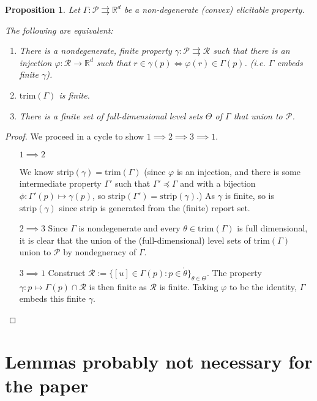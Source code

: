 \documentclass[12pt]{article}
\newcommand{\reals}{\mathbb{R}}
\renewcommand{\P}{\mathcal{P}}
\newcommand{\R}{\mathcal{R}}
\newcommand{\inter}[1]{\mathring{#1}}%
\newcommand{\toto}{\rightrightarrows}
\newcommand{\trim}{\mathrm{trim}}
\newcommand{\strip}{\mathrm{strip}}
\newtheorem{proposition}{Proposition}
\begin{document}
\begin{proposition}\label{prop:optimal-reports-per-level-set}
  Let $\Gamma:\P\toto\reals^d$ be a non-degenerate (convex) elicitable property.

  The following are equivalent:
  \begin{enumerate}
  \item There is a nondegenerate, finite property $\gamma:\P\toto\R$ such that there is an injection $\varphi:\R\to\reals^d$ such that $r\in\gamma(p) \iff \varphi(r) \in \Gamma(p)$. (i.e. $\Gamma$ embeds finite $\gamma$).  
  \item $\trim(\Gamma)$ is finite.     
  \item There is a finite set of full-dimensional level sets $\Theta$ of $\Gamma$ that union to $\P$.

  \end{enumerate}
\end{proposition}

\begin{proof}
We proceed in a cycle to show $1 \implies 2 \implies 3 \implies 1 $.
\begin{enumerate}


\item [$1 \implies 2$]

We know $\strip(\gamma) = \trim(\Gamma)$ (since $\varphi$ is an injection, and there is some intermediate property $\Gamma'$ such that $\Gamma' \preceq \Gamma$ and with a bijection $\phi:\Gamma'(p) \mapsto \gamma(p)$, so $\strip(\Gamma') = \strip(\gamma)$.) 
As $\gamma$ is finite, so is $\strip(\gamma)$ since strip is generated from the (finite) report set.

\item [$2 \implies 3$]
Since $\Gamma$ is nondegenerate and every $\theta \in \trim(\Gamma)$ is full dimensional, it is clear that the union of the (full-dimensional) level sets of $\trim(\Gamma)$ union to $\P$ by nondegneracy of $\Gamma$.
	

\item[$3 \implies 1$]
Construct $\R := \{[u] \in \Gamma(p) : p \in \inter{\theta} \}_{\theta \in \Theta}$.
The property $\gamma: p \mapsto \Gamma(p) \cap\R$ is then finite as $\R$ is finite.
Taking $\varphi$ to be the identity, $\Gamma$ embeds this finite $\gamma$.
\end{enumerate} 

\end{proof}



\section{Lemmas probably not necessary for the paper}
\end{document}
